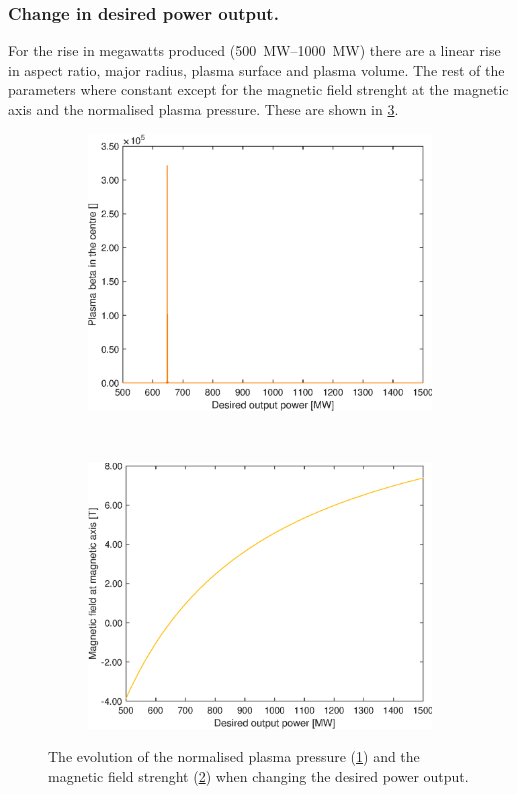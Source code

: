 \subsubsection{Change in desired power output.}
For the rise in megawatts produced (\SIrange{500}{1000}{\mega\watt}) there are a linear rise in aspect ratio, major radius, plasma surface and plasma volume. The rest of the parameters where constant except for the magnetic field strenght at the magnetic axis and the normalised plasma pressure. These are shown in \cref{PE}.
\begin{figure}
	\centering
	\begin{subfigure}[b]{.45\textwidth}
		\includegraphics[width=\textwidth]{MatlabFigures/DesiredOutputPower/PlasmaBetaInTheCentre.eps}
		\caption{}
		\label{PEbeta}
	\end{subfigure}
	~
	\begin{subfigure}[b]{.45\textwidth}
		\includegraphics[width=\textwidth]{MatlabFigures/DesiredOutputPower/MagneticFieldAtMagneticAxis.eps}
		\caption{}
		\label{PEmagnet}
	\end{subfigure}
	\caption{The evolution of the normalised plasma pressure (\cref{PEbeta}) and the magnetic field strenght (\cref{PEmagnet}) when changing the desired power output.}
	\label{PE}
\end{figure}
